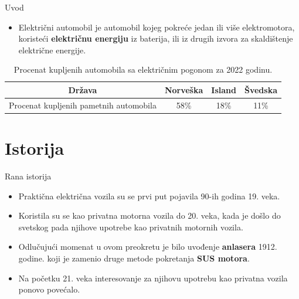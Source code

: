 \documentclass[11pt]{beamer}
\begin{document}
\begin{frame}{Uvod}
\begin{itemize}
    \item  Električni automobil  je automobil kojeg pokreće jedan ili više elektromotora, koristeći \textbf{električnu energiju} iz baterija, ili iz drugih izvora za skaldištenje električne energije.
\end{itemize}
\begin{table}[htb]
        \caption{Procenat kupljenih automobila sa električnim pogonom za 2022 godinu.}
        \label{tab:modelo_tabela}
        \centering
       \begin{tabular}{|c|c|c|c|} \hline
Država& Norveška& Island& Švedska\\ \hline
Procenat kupljenih pametnih automobila& 58\%& 18\%& 11\%\\ \hline
\end{tabular}
        
       
    \end{table}

\end{frame}

\section{Istorija}
\begin{frame}{Rana istorija}
\begin{itemize}
    \item Praktična električna vozila su se prvi put pojavila 90-ih godina 19. veka.
    \item Koristila su se kao privatna motorna vozila do 20. veka, kada je došlo do svetskog pada njihove upotrebe kao privatnih motornih vozila.
    \item Odlučujući momenat u ovom preokretu je bilo uvođenje \textbf{anlasera} 1912. godine. koji je zamenio druge metode pokretanja \textbf{SUS motora}.
    \item Na početku 21. veka interesovanje za njihovu upotrebu kao privatna vozila ponovo povećalo.
\end{itemize}
\end{frame}
\end{document}
